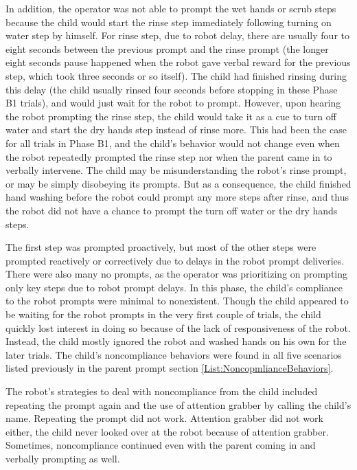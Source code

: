 \documentclass{ut-thesis}
\begin{document}
In addition, the operator was not able to prompt the wet hands or scrub steps because the child would start the rinse step immediately following turning on water step by himself.  For rinse step, due to robot delay, there are usually four to eight seconds between the previous prompt and the rinse prompt (the longer eight seconds pause happened when the robot gave verbal reward for the previous step, which took three seconds or so itself).  The child had finished rinsing during this delay (the child usually rinsed four seconds before stopping in these Phase B1 trials), and would just wait for the robot to prompt.  However, upon hearing the robot prompting the rinse step, the child would take it as a cue to turn off water and start the dry hands step instead of rinse more.  This had been the case for all trials in Phase B1, and the child's behavior would not change even when the robot repeatedly prompted the rinse step nor when the parent came in to verbally intervene.  The child may be misunderstanding the robot's rinse prompt, or may be simply disobeying its prompts.  But as a consequence, the child finished hand washing before the robot could prompt any more steps after rinse, and thus the robot did not have a chance to prompt the turn off water or the dry hands steps.

The first step was prompted proactively, but most of the other steps were prompted reactively or correctively due to delays in the robot prompt deliveries.  There were also many no prompts, as the operator was prioritizing on prompting only key steps due to robot prompt delays.  In this phase, the child's compliance to the robot prompts were minimal to nonexistent.  Though the child appeared to be waiting for the robot prompts in the very first couple of trials, the child quickly lost interest in doing so because of the lack of responsiveness of the robot.  Instead, the child mostly ignored the robot and washed hands on his own for the later trials.  The child's noncompliance behaviors were found in all five scenarios listed previously in the parent prompt section \ref{List:NoncopmlianceBehaviors}.

The robot's strategies to deal with noncompliance from the child included repeating the prompt again and the use of attention grabber by calling the child's name.  Repeating the prompt did not work.  Attention grabber did not work either, the child never looked over at the robot because of attention grabber.  Sometimes, noncompliance continued even with the parent coming in and verbally prompting as well.
\end{document}
